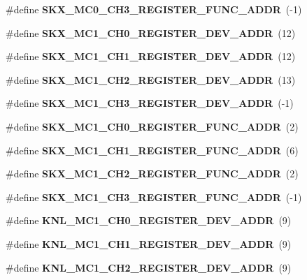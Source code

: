 \begin{DoxyCompactItemize}
\#define {\bfseries S\+K\+X\+\_\+\+M\+C0\+\_\+\+C\+H3\+\_\+\+R\+E\+G\+I\+S\+T\+E\+R\+\_\+\+F\+U\+N\+C\+\_\+\+A\+D\+DR}~(-\/1)
\item 
\mbox{\label{types_8h_a17e737b70fb01d3f10bd10dcd6a23837}} 
\#define {\bfseries S\+K\+X\+\_\+\+M\+C1\+\_\+\+C\+H0\+\_\+\+R\+E\+G\+I\+S\+T\+E\+R\+\_\+\+D\+E\+V\+\_\+\+A\+D\+DR}~(12)
\item 
\mbox{\label{types_8h_aa781c019a24f8b23a0a73cb1fd259241}} 
\#define {\bfseries S\+K\+X\+\_\+\+M\+C1\+\_\+\+C\+H1\+\_\+\+R\+E\+G\+I\+S\+T\+E\+R\+\_\+\+D\+E\+V\+\_\+\+A\+D\+DR}~(12)
\item 
\mbox{\label{types_8h_a28eec6e7329d7224b7eafb002d327e0f}} 
\#define {\bfseries S\+K\+X\+\_\+\+M\+C1\+\_\+\+C\+H2\+\_\+\+R\+E\+G\+I\+S\+T\+E\+R\+\_\+\+D\+E\+V\+\_\+\+A\+D\+DR}~(13)
\item 
\mbox{\label{types_8h_a0450e7933dbb68bdf44bfff6aee1f056}} 
\#define {\bfseries S\+K\+X\+\_\+\+M\+C1\+\_\+\+C\+H3\+\_\+\+R\+E\+G\+I\+S\+T\+E\+R\+\_\+\+D\+E\+V\+\_\+\+A\+D\+DR}~(-\/1)
\item 
\mbox{\label{types_8h_a10d783acc6059a5c2e736579f0d2a3c8}} 
\#define {\bfseries S\+K\+X\+\_\+\+M\+C1\+\_\+\+C\+H0\+\_\+\+R\+E\+G\+I\+S\+T\+E\+R\+\_\+\+F\+U\+N\+C\+\_\+\+A\+D\+DR}~(2)
\item 
\mbox{\label{types_8h_af65392dc3e1fc656ba2a91ccd31a369e}} 
\#define {\bfseries S\+K\+X\+\_\+\+M\+C1\+\_\+\+C\+H1\+\_\+\+R\+E\+G\+I\+S\+T\+E\+R\+\_\+\+F\+U\+N\+C\+\_\+\+A\+D\+DR}~(6)
\item 
\mbox{\label{types_8h_aa038d8e3cd593983491157649f69b3eb}} 
\#define {\bfseries S\+K\+X\+\_\+\+M\+C1\+\_\+\+C\+H2\+\_\+\+R\+E\+G\+I\+S\+T\+E\+R\+\_\+\+F\+U\+N\+C\+\_\+\+A\+D\+DR}~(2)
\item 
\mbox{\label{types_8h_a90aef4eb0524c0fe0eea87a66beae68c}} 
\#define {\bfseries S\+K\+X\+\_\+\+M\+C1\+\_\+\+C\+H3\+\_\+\+R\+E\+G\+I\+S\+T\+E\+R\+\_\+\+F\+U\+N\+C\+\_\+\+A\+D\+DR}~(-\/1)
\item 
\mbox{\label{types_8h_ab08f011483a89649e8015f843b67b4ee}} 
\#define {\bfseries K\+N\+L\+\_\+\+M\+C1\+\_\+\+C\+H0\+\_\+\+R\+E\+G\+I\+S\+T\+E\+R\+\_\+\+D\+E\+V\+\_\+\+A\+D\+DR}~(9)
\item 
\mbox{\label{types_8h_a50df3e58c6ce2919d537c187bb74a043}} 
\#define {\bfseries K\+N\+L\+\_\+\+M\+C1\+\_\+\+C\+H1\+\_\+\+R\+E\+G\+I\+S\+T\+E\+R\+\_\+\+D\+E\+V\+\_\+\+A\+D\+DR}~(9)
\item 
\mbox{\label{types_8h_a546e9db220050d9cdf3a1aab04bb6b7a}} 
\#define {\bfseries K\+N\+L\+\_\+\+M\+C1\+\_\+\+C\+H2\+\_\+\+R\+E\+G\+I\+S\+T\+E\+R\+\_\+\+D\+E\+V\+\_\+\+A\+D\+DR}~(9)

\end{DoxyCompactItemize}
